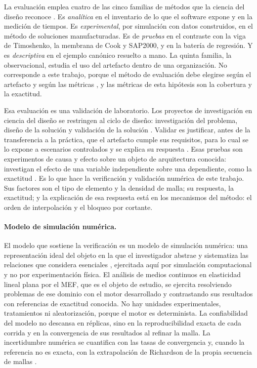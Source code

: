 La evaluación emplea cuatro de las cinco familias de métodos que la ciencia del diseño reconoce \autocite[p.~86]{hevner2004design}. Es \emph{analítica} en el inventario de lo que el software expone y en la medición de tiempos. Es \emph{experimental}, por simulación con datos construidos, en el método de soluciones manufacturadas. Es de \emph{pruebas} en el contraste con la viga de Timoshenko, la membrana de Cook y SAP2000, y en la batería de regresión. Y es \emph{descriptiva} en el ejemplo canónico resuelto a mano. La quinta familia, la observacional, estudia el uso del artefacto dentro de una organización. No corresponde a este trabajo, porque el método de evaluación debe elegirse según el artefacto y según las métricas \autocite[p.~86]{hevner2004design}, y las métricas de esta hipótesis son la cobertura y la exactitud.

Esa evaluación es una validación de laboratorio. Los proyectos de investigación en ciencia del diseño se restringen al ciclo de diseño: investigación del problema, diseño de la solución y validación de la solución \autocite[p.~30]{wieringa2014design}. Validar es justificar, antes de la transferencia a la práctica, que el artefacto cumple sus requisitos, para lo cual se lo expone a escenarios controlados y se explica su respuesta \autocite[p.~31]{wieringa2014design}. Esas pruebas son experimentos de causa y efecto sobre un objeto de arquitectura conocida: investigan el efecto de una variable independiente sobre una dependiente, como la exactitud \autocite[p.~247]{wieringa2014design}. Es lo que hace la verificación y validación numérica de este trabajo. Sus factores son el tipo de elemento y la densidad de malla; su respuesta, la exactitud; y la explicación de esa respuesta está en los mecanismos del método: el orden de interpolación y el bloqueo por cortante.

\paragraph{Modelo de simulación numérica.} El modelo que sostiene la verificación es un modelo de simulación numérica: una representación ideal del objeto en la que el investigador abstrae y sistematiza las relaciones que considera esenciales \autocite[p.~21]{alvarez_metodologia}, ejercitada aquí por simulación computacional y no por experimentación física. El análisis de medios continuos en elasticidad lineal plana por el MEF, que es el objeto de estudio, se ejercita resolviendo problemas de ese dominio con el motor desarrollado y contrastando sus resultados con referencias de exactitud conocida. No hay unidades experimentales, tratamientos ni aleatorización, porque el motor es determinista. La confiabilidad del modelo no descansa en réplicas, sino en la reproducibilidad exacta de cada corrida y en la convergencia de sus resultados al refinar la malla. La incertidumbre numérica se cuantifica con las tasas de convergencia y, cuando la referencia no es exacta, con la extrapolación de Richardson de la propia secuencia de mallas \autocite[pp.~309-312]{oberkampf2010vv}.

